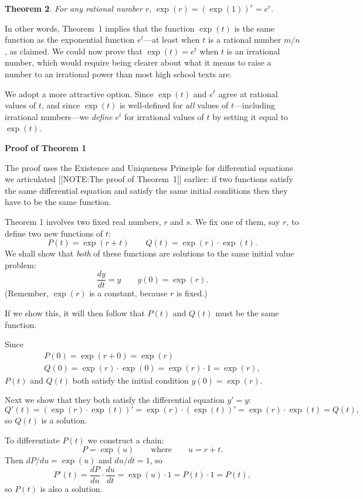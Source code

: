 {\bf Theorem 2}.  {\em For any rational number\/ $r$}, $\exp(r) = \left( \exp(1) \right)^{\displaystyle r} = e^{\displaystyle r}$.



	In other words, Theorem~1 implies that the function $\exp(t)$ is the same function as the exponential function $e^t$---at least when $t$ is a rational number $m/n$, as claimed.  We could now prove that $\exp(t)=e^t$ when $t$ is an irrational number, which would require being clearer about what it means to raise a number to an irrational power than most high school texts are.  

We adopt a more attractive option.  Since $\exp(t)$ and $e^t$ agree at rational values of $t$, and since $\exp(t)$ is well-defined for {\em all} values of $t$---including irrational numbers---we {\em define} $e^t$ for irrational values of $t$ by setting it equal to $\exp(t)$.




{\bf Proof of Theorem 1}


The proof uses the Existence and Uniqueness Principle for differential equations we articulated  	[[NOTE:The proof of Theorem~1]]
earlier:  if two functions satisfy the same differential equation and satisfy the same initial conditions then they have to be the same function.

	Theorem 1 involves two fixed real numbers, $r$ and $s$.  
We fix one of them, say $r$, to define two new functions of $t$:
	\[
P(t) = \exp(r + t) \qquad Q(t) = \exp(r) \cdot \exp(t).
\]
We shall show that {\em both\/} of these functions are solutions to the same initial value problem:
	\[
\dfrac{dy}{dt} = y \qquad y(0) = \exp(r).
\]
(Remember, $\exp(r)$ is a constant, because $r$ is fixed.)  

If we show this, it will then follow that $P(t)$ and $Q(t)$ must be the same function.

Since
	\[
\begin{array}{l}
	P(0) = \exp(r + 0) = \exp(r) \\
	Q(0) = \exp(r) \cdot \exp(0) = \exp(r) \cdot 1 = 
		\exp(r),
	\end{array}
\]
$P(t)$ and $Q(t)$ both satisfy the initial condition $y(0) = \exp(r)$.

Next we show that they both satisfy the differential equation $y' = y$:
	\[
Q'(t) = \left(\exp(r) \cdot \exp(t) \right)' =
		\exp(r) \cdot \left(\exp(t) \right)'= 
		\exp(r) \cdot \exp(t) = Q(t),
\]
so $Q(t)$ is a solution.

To differentiate $P(t)$ we construct a chain:
	\[
P = \exp(u) \qquad \mbox{where} \qquad u = r+ t.
\]
Then $dP/du = \exp(u)$ and $du/dt = 1$, so
	\[
P'(t) = \dfrac{dP}{du} \cdot \dfrac{du}{dt} = 
		\exp(u) \cdot 1 = P(t) \cdot 1 = P(t),
\]
so $P(t)$ is also a solution.

